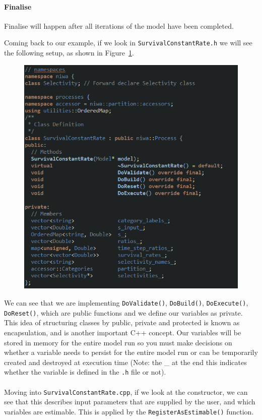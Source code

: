 \paragraph*{Finalise}
Finalise will happen after all iterations of the model have been completed.
\pagebreak


Coming back to our example, if we look in \texttt{SurvivalConstantRate.h} we will {\color{red}see} the following {\color{red}setup}, as shown in Figure~\ref{fig:process_h}{\color{red}.}

\begin{figure}[!ht]
	\centering
	\includegraphics[scale=0.6]{Figures/process_h.png}
	\caption{}\label{fig:process_h}
\end{figure}

We can see that we are implementing \texttt{DoValidate()}, \texttt{DoBuild()}, \texttt{DoExecute()}, \texttt{DoReset()}, which are public functions and we define our variables as private. This idea of structuring classes by public, private and protected is known as encapsulation, and is another important C++ concept. Our variables will be stored in memory for the entire model run so you must make decisions on whether a variable needs to persist for the entire model run or can be temporarily created and destroyed at execution time (Note: the \_ at the end this indicates whether the variable is defined in the \texttt{.h} file or not). 
\\\\
Moving into \texttt{SurvivalConstantRate.cpp}{\color{red},} if we look at the constructor{\color{red}, we} can see that this describes input parameters that are supplied by the user, and which variables are estimable. This is applied by the \texttt{RegisterAsEstimable()} function.

